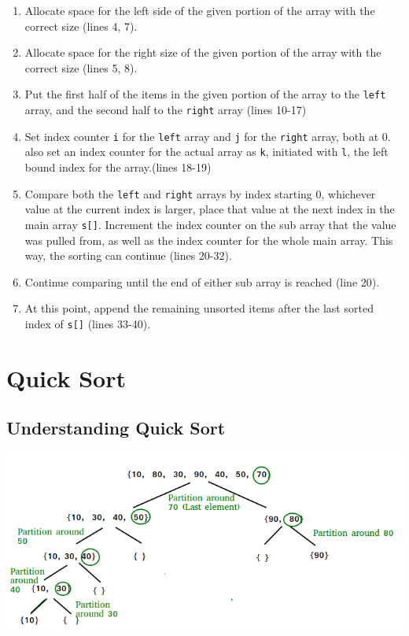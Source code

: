 \documentclass[letterpaper, 10pt]{article}
\begin{document}
\begin{enumerate}
    \item Allocate space for the left side of the given portion of the array with the correct size (lines 4, 7).
    \item Allocate space for the right size of the given portion of the array with the correct size (lines 5, 8).
    \item Put the first half of the items in the given portion of the array to the \texttt{left} array, and the second half to the \texttt{right} array (lines 10-17)
    \item Set index counter \texttt{i} for the \texttt{left} array and \texttt{j} for the \texttt{right} array, both at 0. also set an index counter for the actual array as \texttt{k}, initiated with \texttt{l}, the left bound index for the array.(lines 18-19)
    \item Compare both the \texttt{left} and \texttt{right} arrays by index starting 0, whichever value at the current index is larger, place that value at the next index in the main array \texttt{s[]}. Increment the index counter on the sub array that the value was pulled from, as well as the index counter for the whole main array. This way, the sorting can continue (lines 20-32).
    \item Continue comparing until the end of either sub array is reached (line 20).
    \item At this point, append the remaining unsorted items after the last sorted index of \texttt{s[]} (lines 33-40).
    
   
\end{enumerate}


\section{Quick Sort}
\subsection{Understanding Quick Sort}
\begin{center}
\includegraphics[width=\textwidth]{img/QuickSort.png}
\end{center}
\end{document}
